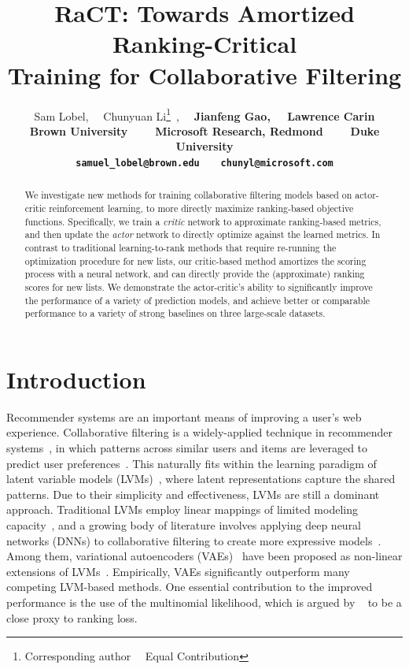 \documentclass{article} \usepackage{iclr2020_conference,times}
\title{RaCT: Towards Amortized Ranking-Critical \\Training for Collaborative Filtering}
\author{Sam Lobel, ~~Chunyuan Li\thanks{Corresponding author~~ Equal Contribution}~, ~~\bf{Jianfeng Gao}, ~~Lawrence Carin \\ 
Brown University ~~~ Microsoft Research, Redmond ~~~   Duke University  \\
{\tt samuel\_lobel@brown.edu} ~~
{\tt chunyl@microsoft.com} 
}
\begin{document}
\maketitle

\begin{abstract}
We investigate new methods for training collaborative filtering models based on actor-critic reinforcement learning, to more directly maximize ranking-based objective functions. Specifically, we train a {\it critic} network to approximate ranking-based metrics, and then update the {\it actor} network to directly optimize against the learned metrics. In contrast to traditional learning-to-rank methods that require re-running the optimization procedure for new lists, our critic-based method amortizes the scoring process with a neural network, and can directly provide the (approximate) ranking scores for new lists.
We demonstrate the actor-critic's ability to significantly improve the performance of a variety of prediction models, and achieve better or comparable performance to a variety of strong baselines on three large-scale datasets.





\end{abstract}



\section{Introduction}

Recommender systems are an important means of improving a user's web experience.
Collaborative filtering is a widely-applied technique in recommender systems~\citep{ricci2015recommender}, in which patterns across similar users and items are leveraged to predict user preferences~\citep{su2009survey}. This naturally fits within the learning paradigm of latent variable models (LVMs)~\citep{bishop2006pattern}, where latent representations capture the shared patterns. Due to their simplicity and effectiveness, LVMs are still a dominant approach.
Traditional LVMs employ linear mappings of limited modeling capacity~\citep{paterek2007improving,mnih2008probabilistic}, and a growing body of literature involves applying deep neural networks (DNNs) to collaborative filtering to create more expressive models~\citep{he2017neural,wu2016collaborative,liang2018variational}.
Among them, variational autoencoders (VAEs)~\citep{kingma2013auto,rezende2014stochastic} have been proposed as non-linear extensions of LVMs~\citep{liang2018variational}. Empirically, VAEs significantly outperform many competing LVM-based methods. One essential contribution to the improved performance is the use of the multinomial likelihood, which is argued by ~\citet{liang2018variational} to be a close proxy to ranking loss.
\end{document}
